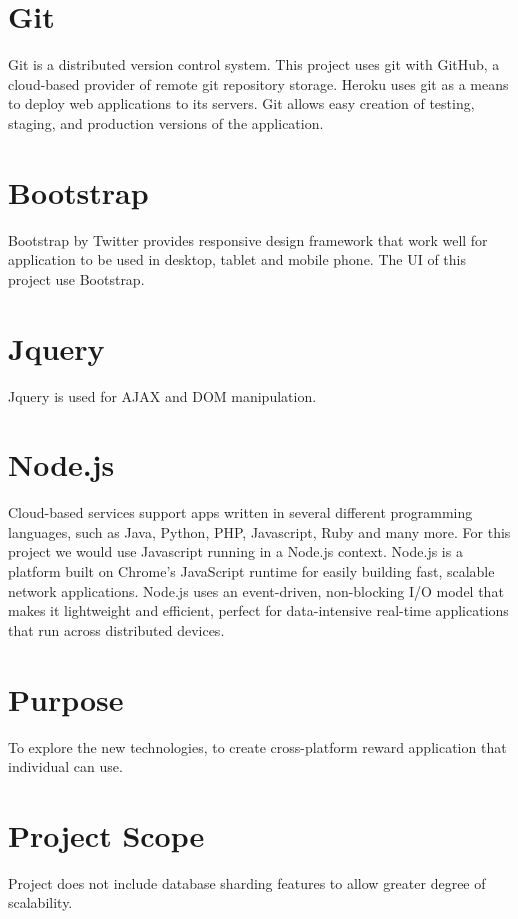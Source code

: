 \section{Git}
Git is a distributed version control system.  This project uses git with GitHub, a cloud-based provider of remote git repository storage.  Heroku uses git as a means to deploy web applications to its servers. Git allows easy creation of testing, staging, and production versions of the application. \cite{github}

\section{Bootstrap}
Bootstrap by Twitter provides responsive design framework that work well for application to be used in desktop, tablet and mobile phone. The UI of this project use Bootstrap. \cite{bootstrap}  

\section{Jquery}
Jquery is used for AJAX and DOM manipulation. \cite{JQuery}

\section{Node.js}
Cloud-based services support apps written in several different programming languages, such as Java, Python, PHP, Javascript, Ruby and many more. For this project we would use Javascript running in a Node.js context. Node.js is a platform built on Chrome's JavaScript runtime for easily building fast, scalable network applications. Node.js uses an event-driven, non-blocking I/O model that makes it lightweight and efficient, perfect for data-intensive real-time applications that run across distributed devices. \cite{nodejs}

\section{Purpose}
To explore the new technologies, to create cross-platform reward application that individual can use.

\section{Project Scope}
Project does not include database sharding features to allow greater degree of scalability. 

